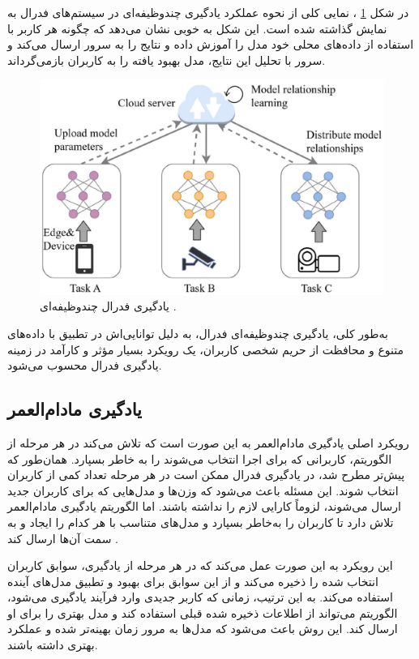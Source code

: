 در شکل
\ref{multi_tasking}%
، نمایی کلی از نحوه عملکرد یادگیری چندوظیفه‌ای در سیستم‌های فدرال به نمایش گذاشته شده است. این شکل به خوبی نشان می‌دهد که چگونه هر کاربر با استفاده از داده‌های محلی خود مدل را آموزش داده و نتایج را به سرور ارسال می‌کند و سرور با تحلیل این نتایج، مدل بهبود یافته را به کاربران بازمی‌گرداند.


\begin{figure}[t]
	\centering
	\includegraphics[scale=0.9]{images/chap3/multi_tasking.png}%
	\caption{%
		یادگیری فدرال چندوظیفه‌ای
		\cite{ma2022state}%
		.
	}
	\label{multi_tasking}
	\centering
\end{figure}


به‌طور کلی، یادگیری چندوظیفه‌ای فدرال، به دلیل توانایی‌اش در تطبیق با داده‌های متنوع و محافظت از حریم شخصی کاربران، یک رویکرد بسیار مؤثر و کارآمد در زمینه یادگیری فدرال محسوب می‌شود.


\subsection{
	یادگیری مادام‌العمر%
}
رویکرد اصلی یادگیری مادام‌العمر به این صورت است که تلاش می‌کند در هر مرحله از الگوریتم، کاربرانی که برای اجرا انتخاب می‌شوند را به خاطر بسپارد. همان‌طور که پیش‌تر مطرح شد، در یادگیری فدرال ممکن است در هر مرحله تعداد کمی از کاربران انتخاب شوند. این مسئله باعث می‌شود که وزن‌ها و مدل‌هایی که برای کاربران جدید ارسال می‌شوند، لزوماً کارایی لازم را نداشته باشند. اما الگوریتم یادگیری مادام‌العمر تلاش دارد تا کاربران را به‌خاطر بسپارد و مدل‌های متناسب با هر کدام را ایجاد و به سمت آن‌ها ارسال کند
\cite{shoham2019overcoming}.

این رویکرد به این صورت عمل می‌کند که در هر مرحله از یادگیری، سوابق کاربران انتخاب شده را ذخیره می‌کند و از این سوابق برای بهبود و تطبیق مدل‌های آینده استفاده می‌کند. به این ترتیب، زمانی که کاربر جدیدی وارد فرآیند یادگیری می‌شود، الگوریتم می‌تواند از اطلاعات ذخیره شده قبلی استفاده کند و مدل بهتری را برای او ارسال کند. این روش باعث می‌شود که مدل‌ها به مرور زمان بهینه‌تر شده و عملکرد بهتری داشته باشند.

